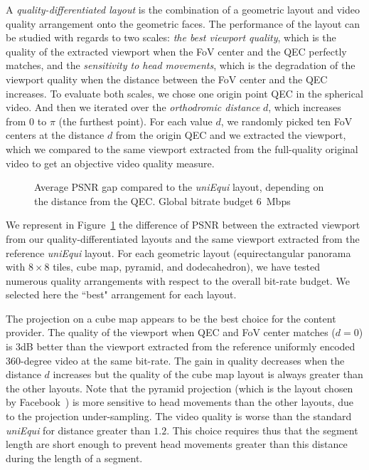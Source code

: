
A \textit{quality-differentiated layout} is the combination of a geometric layout and video quality
arrangement onto the geometric faces. The performance of the layout can be studied with
regards to two scales: \emph{the best viewport quality}, which is the quality of the extracted viewport
when the FoV center and the QEC perfectly matches, and the \emph{sensitivity to head movements},
which is the degradation of the viewport quality when the distance between the FoV center
and the QEC increases.
To evaluate both scales, we chose one origin point \ac{QEC} in the spherical video. And then we iterated
over the \emph{orthodromic distance} $d$, which increases from 0 to $\pi$ (the furthest point). For each
value $d$, we randomly picked ten \ac{FoV} centers at the distance $d$ from the origin \ac{QEC}
and we extracted the viewport, which we compared to the same viewport extracted from the
full-quality original video to get an objective video quality measure.

\begin{figure}
    
    \caption{Average \acs{PSNR} gap compared to the \emph{uniEqui} layout, depending on the distance from the \acs{QEC}. Global bitrate budget \SI{6}{\mega bps}}
    \label{fig:dist_quality_psnr}
\end{figure}

We represent in Figure~\ref{fig:dist_quality_psnr} the difference of \ac{PSNR} between
the extracted viewport from our quality-differentiated layouts and the same viewport extracted from
the reference \textit{uniEqui} layout. For each geometric layout (equirectangular
panorama with $8\times 8$ tiles, cube map, pyramid, and dodecahedron), we have tested
numerous quality arrangements with respect to the overall bit-rate budget. We selected
here the ``best" arrangement for each layout.

The projection on a cube map appears to be the best choice for the content provider. The quality of
the viewport when QEC and FoV center matches ($d=0$) is 3dB better than the viewport extracted
from the reference uniformly encoded 360-degree video at the same bit-rate. The gain in quality
decreases when the distance $d$ increases but the quality of the cube map layout is always greater
than the other layouts. Note that the pyramid projection (which is the layout chosen
by Facebook~\cite{facebook}) is more sensitive to head movements than
the other layouts, due to the projection under-sampling. The video quality is worse than
the standard \emph{uniEqui} for distance greater than $1.2$. This choice requires thus
that the segment length are short enough to prevent head movements greater than this
distance during the length of a segment.

